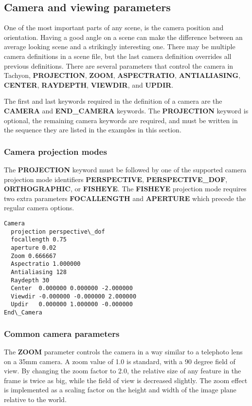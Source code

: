\subsection{Camera and viewing parameters}
  One of the most important parts of any scene, is the camera position and
orientation.  Having a good angle on a scene can make the difference between
an average looking scene and a strikingly interesting one.  There may be
multiple camera definitions in a scene file, but the last camera definition
overrides all previous definitions.
There are several parameters that control the camera in Tachyon, 
{\bf PROJECTION}, {\bf ZOOM}, {\bf ASPECTRATIO}, {\bf ANTIALIASING},
 {\bf CENTER}, {\bf RAYDEPTH}, {\bf VIEWDIR}, and {\bf UPDIR}.  

The first and last keywords required in the definition of a camera are the 
{\bf CAMERA} and {\bf END\_CAMERA} keywords.  The {\bf PROJECTION} keyword 
is optional, the remaining camera keywords are required, and must be 
written in the sequence they are listed in the examples in this section.

\subsubsection{Camera projection modes}
  The {\bf PROJECTION} keyword must be followed by one of the supported
camera projection mode identifiers {\bf PERSPECTIVE}, {\bf PERSPECTIVE\_DOF}, 
{\bf ORTHOGRAPHIC}, or {\bf FISHEYE}.  The {\bf FISHEYE} projection mode 
requires two extra parameters {\bf FOCALLENGTH} and {\bf APERTURE} 
which precede the regular camera options.

\begin{verbatim}
Camera
  projection perspective\_dof
  focallength 0.75
  aperture 0.02
  Zoom 0.666667
  Aspectratio 1.000000
  Antialiasing 128
  Raydepth 30
  Center  0.000000 0.000000 -2.000000
  Viewdir -0.000000 -0.000000 2.000000
  Updir   0.000000 1.000000 -0.000000
End\_Camera
\end{verbatim}

\subsubsection{Common camera parameters}
  The {\bf ZOOM} parameter controls the camera in a way similar to a 
telephoto lens on a 35mm camera.  A zoom value of 1.0 is standard, 
with a 90 degree field of view.  By changing the zoom factor to 2.0, 
the relative size of any feature in the frame is twice as big, while 
the field of view is decreased slightly.  The zoom effect is 
implemented as a scaling factor on the height and width of the image 
plane relative to the world.

